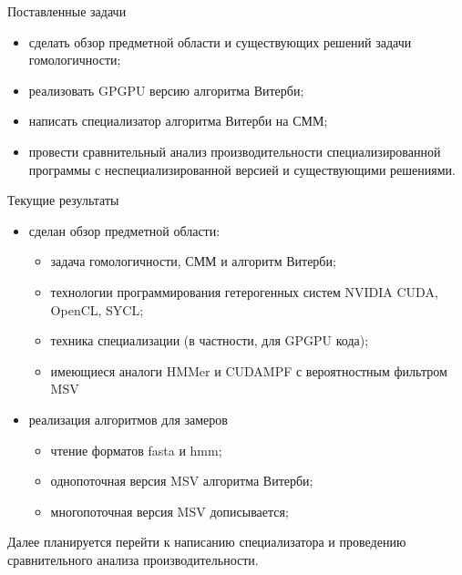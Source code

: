 \documentclass[hyperref={pdfpagelabels=false}]{beamer}
\begin{document}
\begin{frame}{Поставленные задачи}
\begin{itemize}
	\item сделать обзор предметной области и существующих решений задачи 
		гомологичности;
	\vfill
	\item реализовать GPGPU версию алгоритма Витерби;
	\vfill
	\item написать специализатор алгоритма Витерби на СММ;
	\vfill
	\item провести сравнительный анализ производительности специализированной 
		программы с неспециализированной версией и существующими решениями.
\end{itemize}
\end{frame}


\begin{frame}{Текущие результаты}
\begin{itemize}
	\item сделан обзор предметной области:
	\begin{itemize}	
		\item задача гомологичности, СММ и алгоритм Витерби;
		\item технологии программирования гетерогенных систем NVIDIA CUDA, 		
			OpenCL, SYCL;
		\item техника специализации (в частности, для GPGPU кода);
		\item имеющиеся аналоги HMMer и CUDAMPF с вероятностным фильтром MSV
	\end{itemize}
	\vfill
	\item реализация алгоритмов для замеров
		\begin{itemize}
			\item чтение форматов fasta и hmm;
			\item однопоточная версия MSV алгоритма Витерби;
			\item многопоточная версия MSV дописывается;
		\end{itemize}
\end{itemize}
\vfill
Далее планируется перейти к написанию специализатора и проведению 
сравнительного анализа производительности.
\end{frame} 
\end{document}
